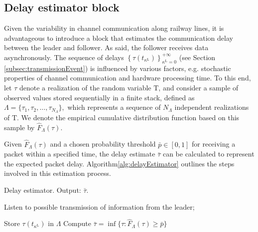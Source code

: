 \subsection{Delay estimator block}
\label{subsec:delayEstimator}  


Given the variability in channel communication along railway lines, it is advantageous to introduce a block that estimates the communication delay between the leader and follower. As said, the follower receives data asynchronously. The sequence of delays $ \left\{ \tau(t_{\kappa^\mathrm{L}})\right\}_{\kappa^\mathrm{L}=0}^{+\infty}$ (see Section \ref{subsec:transmissionEvent}) is influenced by various factors, e.g. stochastic properties of channel communication and hardware processing time. To this end, let \( \tau \) denote a realization of the random variable \( \mathrm{T} \), and consider a sample of observed values stored sequentially in a finite stack, defined as \( \Lambda = \{\tau_1, \tau_2, \dots, \tau_{N_\Lambda}\},\) which represents a sequence of \( N_\Lambda \) independent realizations of \( \mathrm{T} \). We denote the empirical cumulative distribution function based on this sample by \( \hat{F}_\Lambda(\tau) \).



Given \( \hat{F}_\Lambda(\tau) \) and a chosen probability threshold \( \bar{p} \in [0,1] \) for receiving a packet within a specified time, the delay estimate \( \bar{\tau} \) can be calculated to represent the expected packet delay.
Algorithm\tildeAdd\ref{alg:delayEstimator} outlines the steps involved in this estimation process.

\begin{algorithm}
	\caption{Delay estimator. Output: $\bar{\tau}$. }\label{alg:delayEstimator}
	\begin{algorithmic}[1]
		\Loop
		
		\State Listen to possible transmission of information from the leader;
		
		
		
		\State Store $\tau(t_{\kappa^\mathrm{L}})$ in $\Lambda$
		\State Compute $\bar{\tau} = \inf \{ \tau : \hat{F}_\Lambda(\tau) \geq \bar{p} \}
		$  
		
		
		\EndIf
		
		
		
		\EndLoop
		
	\end{algorithmic}
\end{algorithm}

